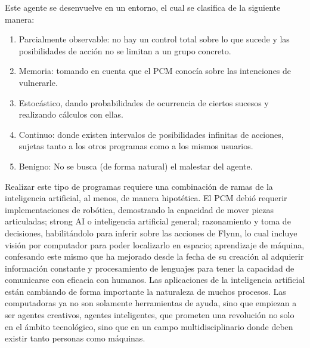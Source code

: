 \documentclass[]{scrreprt}
\begin{document}
Este agente se desenvuelve en un entorno, el cual se clasifica de la siguiente manera:
\begin{enumerate}
\item Parcialmente observable: no hay un control total sobre lo que sucede y las posibilidades de acción no se limitan a un grupo concreto.
\item Memoria: tomando en cuenta que el PCM conocía sobre las intenciones de vulnerarle.
\item Estocástico, dando probabilidades de ocurrencia de ciertos sucesos y realizando cálculos con ellas.
\item Continuo: donde existen intervalos de posibilidades infinitas de acciones, sujetas tanto a los otros programas como a los mismos usuarios.
\item Benigno: No se busca (de forma natural) el malestar del agente.
\end{enumerate}  
Realizar este tipo de programas requiere una combinación de ramas de la inteligencia artificial, al menos, de manera hipotética. El PCM debió requerir implementaciones de robótica, demostrando la capacidad de mover piezas articuladas; strong AI o inteligencia artificial general; razonamiento y toma de decisiones, habilitándolo para inferir sobre las acciones de Flynn, lo cual incluye visión por computador para poder localizarlo en espacio; aprendizaje de máquina, confesando este mismo que ha mejorado desde la fecha de su creación al adquierir información constante y procesamiento de lenguajes para tener la capacidad de comunicarse con eficacia con humanos.
\newline
\newline
Las aplicaciones de la inteligencia artificial están cambiando de forma importante la naturaleza de muchos procesos. Las computadoras ya no son solamente herramientas de ayuda, sino que empiezan a ser agentes creativos, agentes inteligentes, que prometen una revolución no solo en el ámbito tecnológico, sino que en un campo multidisciplinario donde deben existir tanto personas como máquinas.
\end{document}
